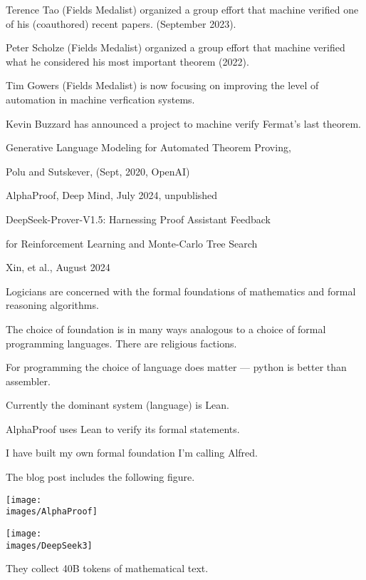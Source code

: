 {

Terence Tao (Fields Medalist) organized a group effort that machine verified one of his (coauthored) recent papers. (September 2023).

\vfill
Peter Scholze (Fields Medalist) organized a group effort that machine verified what he considered his most important theorem (2022).

\vfill
Tim Gowers (Fields Medalist) is now focusing on improving the level of automation in machine verfication systems.

\vfill
Kevin Buzzard has announced a project to machine verify Fermat's last theorem.


\vfill
\centerline{Generative Language Modeling for Automated Theorem Proving,}
\centerline{Polu and Sutskever, (Sept, 2020, OpenAI)}

\vfill
AlphaProof, Deep Mind, July 2024, unpublished

\vfill
\centerline{DeepSeek-Prover-V1.5: Harnessing Proof Assistant Feedback}
\centerline{for Reinforcement Learning and Monte-Carlo Tree Search}
\centerline{Xin, et al., August 2024}


Logicians are concerned with the formal foundations of mathematics and formal reasoning algorithms.

\vfill
The choice of foundation is in many ways analogous to a choice of formal programming languages.  There are religious factions.

\vfill
For programming the choice of language does matter --- python is better than assembler.

Currently the dominant system (language) is Lean.

\vfill
AlphaProof uses Lean to verify its formal statements.

\vfill
I have built my own formal foundation I'm calling Alfred.


The blog post includes the following figure.

\centerline{\texttt{[image: \\images/AlphaProof]}}



\centerline{\texttt{[image: \\images/DeepSeek3]}}

\vfill
They collect 40B tokens of mathematical text.


}
